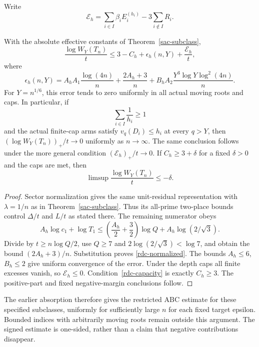 Write
\[
 \mathcal E_h=\sum_{i\in I}\beta_iE_i^{(h_i)}-
                       3\sum_{i\notin I}R_i.
\]
\begin{theorem}\label{rdc-uniform}
With the absolute effective constants of Theorem~\ref{sac-subclass},
\begin{equation}\label{rdc-normalized}
 \frac{\log W_Y(T_n)}t
 \le3-C_h+\epsilon_h(n,Y)+\frac{\mathcal E_h}{t},
\end{equation}
where
\[
 \epsilon_h(n,Y)=A_hA_1\frac{\log(4n)}n+\frac{2A_h+3}{n}
       +B_hA_2\frac{Y^3\log Y\log^2(4n)}n.
\]
For $Y=n^{1/6}$, this error tends to zero uniformly in all actual
moving roots and caps. In particular, if
\begin{equation}\label{rdc-capacity}
 \sum_{i\in I}\frac1{h_i}\ge1
\end{equation}
and the actual finite-cap arms satisfy $v_q(D_i)\le h_i$ at every
$q>Y$, then $(\log W_Y(T_n))_+/t\to0$ uniformly as $n\to\infty$.
The same conclusion follows under the more general condition
$(\mathcal E_h)_+/t\to0$. If $C_h\ge3+\delta$ for a fixed
$\delta>0$ and the caps are met, then
\[
 \limsup\frac{\log W_Y(T_n)}t\le-\delta.
\]
\end{theorem}
\begin{proof}
Sector normalization gives the same unit-residual representation
with $\lambda=1/n$ as in Theorem~\ref{sac-subclass}. Thus its
all-prime two-place bounds control $\Delta/t$ and $L/t$ as stated
there. The remaining numerator obeys
\[
 A_h\log c_1+\log T_1
 \le\left(\frac{A_h}{2}+\frac32\right)\log Q
                          +A_h\log(2/\sqrt3).
\]
Divide by $t\ge n\log Q/2$, use $Q\ge7$ and
$2\log(2/\sqrt3)<\log7$, and obtain the bound $(2A_h+3)/n$.
Substitution proves \eqref{rdc-normalized}. The bounds $A_h\le6$,
$B_h\le2$ give uniform convergence of the error. Under the depth
caps all finite excesses vanish, so $\mathcal E_h\le0$.
Condition~\eqref{rdc-capacity} is exactly $C_h\ge3$.
The positive-part and fixed negative-margin conclusions follow.
\end{proof}

The earlier absorption therefore gives the restricted ABC estimate
for these specified subclasses, uniformly for sufficiently large $n$
for each fixed target epsilon. Bounded indices with arbitrarily
moving roots remain outside this argument. The signed estimate is
one-sided, rather than a claim that negative contributions disappear.

